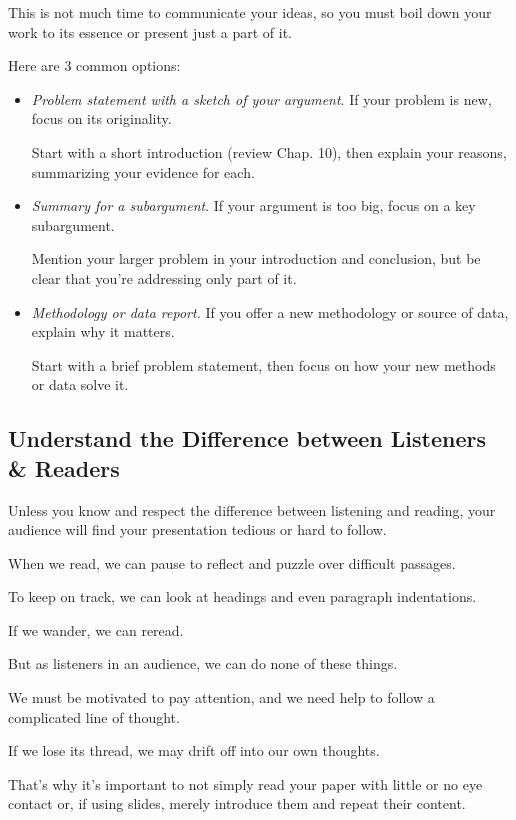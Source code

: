 \documentclass[oneside]{book}
\numberwithin{equation}{section}
\begin{document}
This is not much time to communicate your ideas, so you must boil down your work to its essence or present just a part of it.

Here are 3 common options:
\begin{itemize}
    \item \textit{Problem statement with a sketch of your argument}. If your problem is new, focus on its originality.
    
    Start with a short introduction (review Chap. 10), then explain your reasons, summarizing your evidence for each.
    \item \textit{Summary for a subargument}. If your argument is too big, focus on a key subargument.
    
    Mention your larger problem in your introduction and conclusion, but be clear that you're addressing only part of it.
    \item \textit{Methodology or data report.} If you offer a new methodology or source of data, explain why it matters.
    
    Start with a brief problem statement, then focus on how your new methods or data solve it. 
\end{itemize}

\subsection{Understand the Difference between Listeners \& Readers}
Unless you know and respect the difference between listening and reading, your audience will find your presentation tedious or hard to follow.

When we read, we can pause to reflect and puzzle over difficult passages.

To keep on track, we can look at headings and even paragraph indentations.

If we wander, we can reread.

But as listeners in an audience, we can do none of these things.

We must be motivated to pay attention, and we need help to follow a complicated line of thought.

If we lose its thread, we may drift off into our own thoughts.

%
That's why it's important to not simply read your paper with little or no eye contact or, if using slides, merely introduce them and repeat their content.

\end{document}
